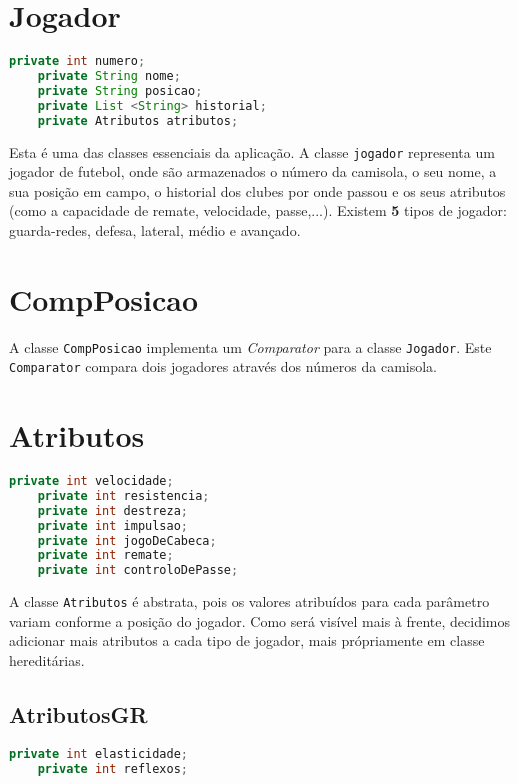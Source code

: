 \documentclass[a4paper]{report}
\begin{document}
    \section{Jogador}
    \begin{lstlisting}[language=Java]
    private int numero; 
    private String nome; 
    private String posicao; 
    private List <String> historial; 
    private Atributos atributos; 
    \end{lstlisting}
    
      Esta é uma das classes essenciais da aplicação. A classe \texttt{jogador} representa um jogador de futebol, onde são armazenados o número da camisola, o seu nome, a sua posição em campo, o historial dos clubes por onde passou e os seus atributos (como a capacidade de remate, velocidade, passe,...). Existem \textbf{5} tipos de jogador: guarda-redes, defesa, lateral, médio e avançado.
      
      
    \section{CompPosicao}
    
    A classe \texttt{CompPosicao} implementa um \textit{Comparator} para a classe \texttt{Jogador}.
    Este \texttt{Comparator} compara dois jogadores através dos números da camisola. 
    
	\section{Atributos}
	\begin{lstlisting}[language=Java]
    private int velocidade;
    private int resistencia;
    private int destreza;
    private int impulsao;
    private int jogoDeCabeca;
    private int remate;
    private int controloDePasse;
    \end{lstlisting}
    
    A classe \texttt{Atributos} é abstrata, pois os valores atribuídos para cada parâmetro variam conforme a posição do jogador. Como será visível mais à frente, decidimos adicionar mais atributos 
    a cada tipo de jogador, mais própriamente em classe hereditárias. 
	
	\subsection{AtributosGR}
	\begin{lstlisting}[language=Java]
    private int elasticidade;
    private int reflexos;
    \end{lstlisting}
    
\end{document}
